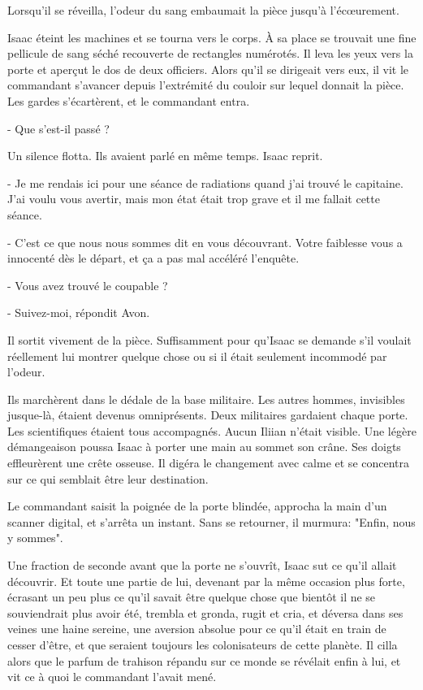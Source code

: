 \documentclass[12pt]{book}
\begin{document}
Lorsqu'il se réveilla, l'odeur du sang embaumait la pièce jusqu'à l'écœurement.


Isaac éteint les machines et se tourna vers le corps. À sa place se trouvait une fine pellicule de sang séché recouverte de rectangles numérotés. Il leva les yeux vers la porte et aperçut le dos de deux officiers. Alors qu'il se dirigeait vers eux, il vit le commandant s'avancer depuis l'extrémité du couloir sur lequel donnait la pièce. Les gardes s'écartèrent, et le commandant entra.


- Que s'est-il passé ?


Un silence flotta. Ils avaient parlé en même temps. Isaac reprit.


- Je me rendais ici pour une séance de radiations quand j'ai trouvé le capitaine. J'ai voulu vous avertir, mais mon état était trop grave et il me fallait cette séance.

- C'est ce que nous nous sommes dit en vous découvrant. Votre faiblesse vous a innocenté dès le départ, et ça a pas mal accéléré l'enquête.

- Vous avez trouvé le coupable ?

- Suivez-moi, répondit Avon.


Il sortit vivement de la pièce. Suffisamment pour qu'Isaac se demande s’il voulait réellement lui montrer quelque chose ou si il était seulement incommodé par l'odeur.


Ils marchèrent dans le dédale de la base militaire. Les autres hommes, invisibles jusque-là, étaient devenus omniprésents. Deux militaires gardaient chaque porte. Les scientifiques étaient tous accompagnés. Aucun Iliian n'était visible. Une légère démangeaison poussa Isaac à porter une main au sommet son crâne. Ses doigts effleurèrent une crête osseuse. Il digéra le changement avec calme et se concentra sur ce qui semblait être leur destination.


Le commandant saisit la poignée de la porte blindée, approcha la main d'un scanner digital, et s'arrêta un instant. Sans se retourner, il murmura: "Enfin, nous y sommes".

Une fraction de seconde avant que la porte ne s'ouvrît, Isaac sut ce qu'il allait découvrir. Et toute une partie de lui, devenant par la même occasion plus forte, écrasant un peu plus ce qu'il savait être quelque chose que bientôt il ne se souviendrait plus avoir été, trembla et gronda, rugit et cria, et déversa dans ses veines une haine sereine, une aversion absolue pour ce qu'il était en train de cesser d'être, et que seraient toujours les colonisateurs de cette planète. Il cilla alors que le parfum de trahison répandu sur ce monde se révélait enfin à lui, et vit ce à quoi le commandant l'avait mené.
\end{document}
